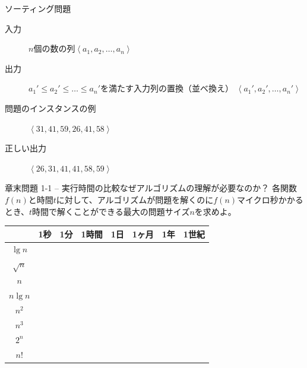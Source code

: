 \documentclass[unicode,11pt,aspectratio=169,hide notes]{beamer} %
\begin{document}

\begin{frame}{ソーティング問題}
  \begin{description}
  \item[入力] $n$個の数の列$\left\langle a_1, a_2, \ldots, a_n\right\rangle$

  \item[出力] $a_1'\leq a_2'\leq \ldots\leq a_n'$を満たす入力列の置換（並べ換え）
  $\left\langle a_1', a_2', \ldots, a_n'\right\rangle$
  \end{description}
  
  \vspace{5mm}

  \begin{description}
  \item[問題のインスタンスの例]
  $\left\langle 31, 41, 59, 26, 41, 58\right\rangle$

  \item[正しい出力] $\left\langle 26, 31, 41, 41, 58, 59\right\rangle$
  \end{description}
\end{frame}


\begin{frame}{章末問題 1-1 -- 実行時間の比較}{なぜアルゴリズムの理解が必要なのか？}
  各関数$f(n)$と時間$t$に対して、アルゴリズムが問題を解くのに$f(n)$マイクロ秒かかる
  とき、$t$時間で解くことができる最大の問題サイズ$n$を求めよ。

  \begin{center}
    \begin{tabular}{|c|c|c|c|c|c|c|c|}
      \hline
      & 1秒 & 1分 & 1時間 & 1日 & 1ヶ月 & 1年 & 1世紀 \\ \hline
      $\lg n$ & & & & & & & \\ \hline
      $\sqrt{n}$ & & & & & & & \\ \hline
      $n$ & & & & & & & \\ \hline
      $n\lg n$ & & & & & & & \\ \hline
      $n^2$ & & & & & & & \\ \hline
      $n^3$ & & & & & & & \\ \hline
      $2^n$ & & & & & & & \\ \hline
      $n!$ & & & & & & & \\
      \hline
    \end{tabular}
  \end{center}
\end{frame}
\end{document}
